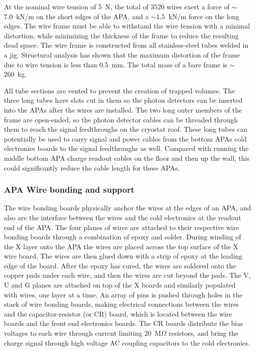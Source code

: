 At the nominal wire tension of 5~N, the total of 3520 wires exert a
force of $\sim$7.0~kN/m on the short edges of the APA, and a
$\sim$1.5~kN/m force on the long edges. The wire frame must be able to
withstand the wire tension with a minimal distortion, while minimizing
the thickness of the frame to reduce the resulting dead space. The
wire frame is constructed from all stainless-steel tubes welded in a
jig.  Structural analysis has shown that the maximum distortion of the
frame due to wire tension is less than 0.5~mm. The total mass of a
bare frame is $\sim$260~kg.


All tube sections are vented to prevent the creation of trapped
volumes. The three long tubes have slots cut in them so the photon
detectors can be inserted into the APAs after the wires are installed.
The two long outer members of the frame are open-ended, so the photon
detector cables can be threaded through them to reach the signal
feedthroughs on the cryostat roof.  These long tubes can potentially
be used to carry signal and power cables from the bottom APAs cold
electronics boards to the signal feedthroughs as well.  Compared with
running the middle bottom APA charge readout cables on the floor and
then up the wall, this could significantly reduce the cable length for
these APAs.


\subsubsection{APA Wire bonding and support}
\label{subsec:fd-ref-wirewrap}


The wire bonding boards physically anchor the wires at the edges of an
APA, and also are the interface between the wires and the cold
electronics at the readout end of the APA.  The four planes of wires
are attached to their respective wire bonding boards through a
combination of epoxy and solder. During winding of the X layer onto
the APA the wires are placed across the top surface of the X wire
board. The wires are then glued down with a strip of epoxy at the
leading edge of the board.  After the epoxy has cured, the wires are
soldered onto the copper pads under each wire, and then the wires are
cut beyond the pads. The V, U and G planes are attached on top of the
X boards and similarly populated with wires, one layer at a time. An
array of pins is pushed through holes in the stack of wire bonding
boards, making electrical connections between the wires and the
capacitor-resistor (or CR) board, which is located between the wire
boards and the front end electronics boards.  The CR boards distribute
the bias voltages to each wire through current limiting 20~M$\Omega$
resistors, and bring the charge signal through high voltage AC
coupling capacitors to the cold electronics.

